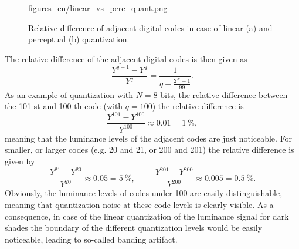 \begin{figure}[]
	\centering
	\begin{overpic}[width = 1\columnwidth ]{figures_en/linear_vs_perc_quant.png}
	\end{overpic}
	\caption{
Relative difference of adjacent digital codes in case of linear (a) and perceptual (b) quantization.}
	\label{Fig:linear_vs_perc_quant}
\end{figure}

The relative difference of the adjacent digital codes is then given as
\begin{equation}
\frac{Y^{q+1}-Y^q}{Y^q} = \frac{1 }{q + \frac{2^N - 1}{99}}.
\label{Eq:rel_dif}
\end{equation}
As an example of quantization with $N = 8$ bits, the relative difference between the 101-st and 100-th code (with $q = 100$) the relative difference is
\begin{equation*}
\frac{Y^{101}-Y^{100}}{Y^{100}} \approx 0.01 = 1~\%,
\end{equation*}
meaning that the luminance levels of the adjacent codes are just noticeable.
For smaller, or larger codes (e.g. 20 and 21, or 200 and 201) the relative difference is given by
\begin{equation*}
\frac{Y^{21}-Y^{20}}{Y^{20}} \approx 0.05 = 5~\%, \hspace{1cm} \frac{Y^{201}-Y^{200}}{Y^{200}} \approx 0.005 = 0.5~\%.
\label{eq:code_100}
\end{equation*}
Obviously, the luminance levels of codes under 100 are easily distinguishable, meaning that quantization noise at these code levels is clearly visible.
As a consequence, in case of the linear quantization of the luminance signal for dark shades the boundary of the different quantization levels would be easily noticeable, leading to so-called banding artifact.

